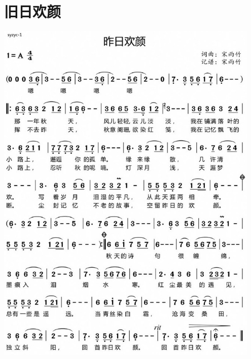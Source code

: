 \documentclass[cn,pad,twocol]{elegantbook}
\begin{document}
\section{旧日欢颜}  \includegraphics[width=0.95\textwidth]{dongxiao/20200901-旧日欢颜.jpeg} 
\end{document}
